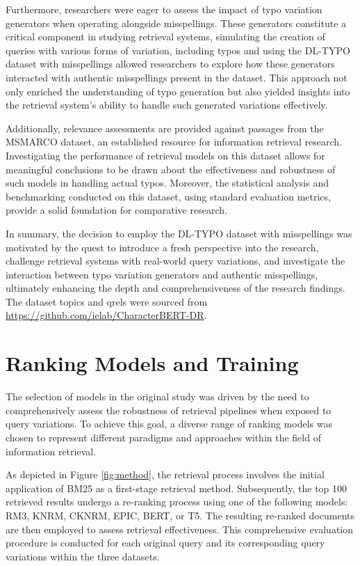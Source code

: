 Furthermore, researchers were eager to assess the impact of typo variation generators when operating alongside misspellings. These generators constitute a critical component in studying retrieval systems, simulating the creation of queries with various forms of variation, including typos and using the DL-TYPO dataset with misspellings allowed researchers to explore how these generators interacted with authentic misspellings present in the dataset. This approach not only enriched the understanding of typo generation but also yielded insights into the retrieval system's ability to handle such generated variations effectively.


Additionally, relevance assessments are provided against passages from the MSMARCO dataset, an established resource for information retrieval research. Investigating the performance of retrieval models on this dataset allows for meaningful conclusions to be drawn about the effectiveness and robustness of such models in handling actual typos. Moreover, the statistical analysis and benchmarking conducted on this dataset, using standard evaluation metrics, provide a solid foundation for comparative research. 

In summary, the decision to employ the DL-TYPO dataset with misspellings was motivated by the quest to introduce a fresh perspective into the research, challenge retrieval systems with real-world query variations, and investigate the interaction between typo variation generators and authentic misspellings, ultimately enhancing the depth and comprehensiveness of the research findings. The dataset topics and qrels were sourced from \url{https://github.com/ielab/CharacterBERT-DR}.

\section{Ranking Models and Training}
The selection of models in the original study was driven by the need to comprehensively assess the robustness of retrieval pipelines when exposed to query variations. To achieve this goal, a diverse range of ranking models was chosen to represent different paradigms and approaches within the field of information retrieval.

As depicted in Figure \ref{fig:method}, the retrieval process involves the initial application of BM25 as a first-stage retrieval method. Subsequently, the top 100 retrieved results undergo a re-ranking process using one of the following models: RM3, KNRM, CKNRM, EPIC, BERT, or T5. The resulting re-ranked documents are then employed to assess retrieval effectiveness. This comprehensive evaluation procedure is conducted for each original query and its corresponding query variations within the three datasets.

